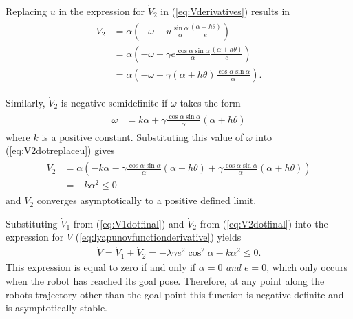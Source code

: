 Replacing $u$ in the expression for $\dot{V}_2$ in (\ref{eq:Vderivatives}) results in
\begin{align}
\label{eq:V2dotreplaceu}
\begin{split}
\dot{V}_2 &= \alpha\left(-\omega+u\frac{\sin\alpha}{\alpha}\frac{(\alpha+h\theta)}{e}\right) \\
&= \alpha\left(-\omega+\gamma e\frac{\cos\alpha\sin\alpha}{\alpha}\frac{(\alpha+h\theta)}{e}\right) \\
&= \alpha\left(-\omega+\gamma(\alpha+h\theta)\frac{\cos\alpha\sin\alpha}{\alpha}\right).
\end{split}
\end{align}

Similarly, $\dot{V}_2$ is negative semidefinite if $\omega$ takes the form
\begin{align}
\label{eq:lyapunovomega}
\begin{split}
\omega &= k\alpha + \gamma\frac{\cos\alpha\sin\alpha}{\alpha}\left(\alpha+h\theta\right)
\end{split}
\end{align}
where $k$ is a positive constant. Substituting this value of $\omega$ into (\ref{eq:V2dotreplaceu}) gives
\begin{align}
\label{eq:V2dotfinal}
\begin{split}
\dot{V}_2 &= \alpha\left(-k\alpha-\gamma\frac{\cos\alpha\sin\alpha}{\alpha}(\alpha+h\theta) + \gamma\frac{\cos\alpha\sin\alpha}{\alpha}(\alpha+h\theta)\right) \\
&= -k\alpha^2 \leq 0
\end{split}
\end{align}
and $V_2$ converges asymptotically to a positive defined limit.

Substituting $\dot{V}_1$ from (\ref{eq:V1dotfinal}) and $\dot{V}_2$ from (\ref{eq:V2dotfinal}) into the expression for $\dot{V}$ (\ref{eq:lyapunovfunctionderivative}) yields
\begin{align*}
\dot{V} = \dot{V}_1 + \dot{V}_2 = -\lambda\gamma e^2\cos^2\alpha - k\alpha^2 \leq 0.
\end{align*}
This expression is equal to zero if and only if $\alpha=0$ \textit{and} $e=0$, which only occurs when the robot has reached its goal pose. Therefore, at any point along the robots trajectory other than the goal point this function is negative definite and is asymptotically stable.

